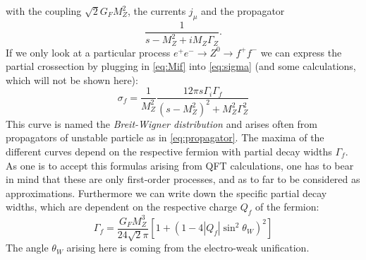 with the coupling $\sqrt{2} G_F M_Z^2$, the currents $j_\mu$ and the propagator
\begin{equation}
\frac{1}{s - M_Z^2 + iM_Z \Gamma_Z}.
\label{eq:propagator}
\end{equation}
If we only look at a particular process $e^{+}e^- \rightarrow Z^0 \rightarrow f^+ f^-$ we can express the partial crossection
by plugging in \eqref{eq:Mif} into  \eqref{eq:sigma} (and some calculations, which will not be shown here):
\begin{equation}
    \label{eq:breitwigner}
    \sigma_f = \frac{1}{M_Z^2} \frac{12\pi s \Gamma_i \Gamma_f }{(s- M_Z^2)^2 + M_Z^2 \Gamma_Z^2}
\end{equation}
This curve is named the \textit{Breit-Wigner distribution} and arises often from propagators of unstable particle as in 
\eqref{eq:propagator}. The maxima of the different curves depend on the respective fermion with 
partial decay widths $\Gamma_f$. As one is to accept this formulas arising from QFT calculations, one has to bear in mind
that these are only first-order processes, and as to far to be considered as approximations. Furthermore we can write down
the specific partial decay widths, which are dependent on the respective charge $Q_f$ of the fermion:
\begin{equation}
    \label{eq:gamma_f}
    \Gamma_f = \frac{G_F M_Z^3}{24 \sqrt{2} \pi} \left[ 1 + (1 - 4 |Q_f| \sin^2 \theta_W )^2 \right]
\end{equation}
The angle $\theta_W$ arising here is coming from the electro-weak unification.
